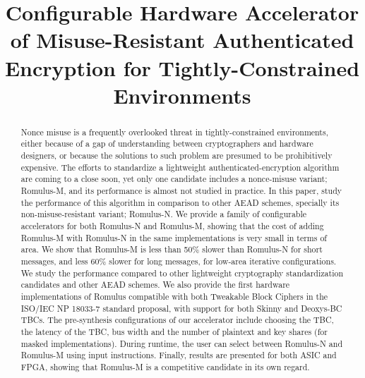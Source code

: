 \documentclass[conference]{IEEEtran}
\begin{document}
\newcommand{\etal}{{\it et al.}\xspace}
\newcommand{\eg}{{\it e.g.}\xspace}

\title{Configurable Hardware Accelerator of Misuse-Resistant Authenticated Encryption for Tightly-Constrained Environments}
\author{
}

\maketitle

\begin{abstract}
  Nonce misuse is a frequently overlooked threat in tightly-constrained environments, either because of a gap of understanding between cryptographers and hardware designers, or because the solutions to such problem are presumed to be prohibitively expensive. The efforts to standardize a lightweight authenticated-encryption algorithm are coming to a close soon, yet only one candidate includes a nonce-misuse variant; Romulus-M, and its performance is almost not studied in practice. In this paper, study the performance of this algorithm in comparison to other AEAD schemes, specially its non-misuse-resistant variant; Romulus-N. We provide a family of configurable accelerators for both Romulus-N and Romulus-M, showing that the cost of adding Romulus-M with Romulus-N in the same implementations is very small in terms of area. We show that Romulus-M is less than 50\% slower than Romulus-N for short messages, and less 60\% slower for long messages, for low-area iterative configurations. We study the performance compared to other lightweight cryptography standardization candidates and other AEAD schemes. We also provide the first hardware implementations of Romulus compatible with both Tweakable Block Ciphers in the ISO/IEC NP 18033-7 standard proposal, with support for both Skinny and Deoxys-BC TBCs. The pre-synthesis configurations of our accelerator include choosing the TBC, the latency of the TBC, bus width and the number of plaintext and key shares (for masked implementations). During runtime, the user can select between Romulus-N and Romulus-M using input instructions. Finally, results are presented for both ASIC and FPGA, showing that Romulus-M is a competitive candidate in its own regard.
\end{abstract}
\end{document}
